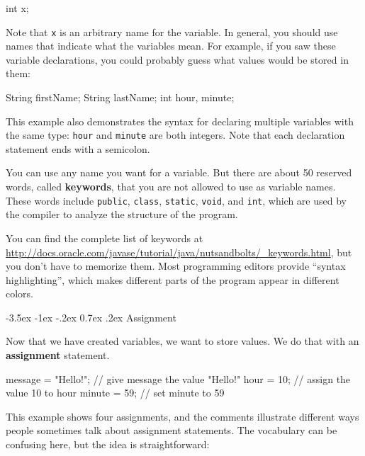 \documentclass[12pt]{book}
\makeatletter
\theoremstyle{exercise}
\newcommand{\java}[1]{\verb"#1"}
\renewcommand{\section}{\@startsection{section}{1}{\z@}%
    {-3.5ex \@plus -1ex \@minus -.2ex}%
    {0.7ex \@plus.2ex}%
    {\normalfont\Large\bfseries}}
\newcommand{\java}[1]{\lstinline{#1}} %
\makeatother
\begin{document}
\begin{code}
    int x;
\end{code}

Note that \java{x} is an arbitrary name for the variable.
In general, you should use names that indicate what the variables mean.
For example, if you saw these variable declarations, you could probably guess what values would be stored in them:

\begin{code}
    String firstName;
    String lastName;
    int hour, minute;
\end{code}

This example also demonstrates the syntax for declaring multiple variables with the same type: \java{hour} and \java{minute} are both integers.
Note that each declaration statement ends with a semicolon.

You can use any name you want for a variable.
But there are about 50 reserved words, called {\bf keywords}, that you are not allowed to use as variable names.
These words include \java{public}, \java{class}, \java{static}, \java{void}, and \java{int}, which are used by the compiler to analyze the structure of the program.

You can find the complete list of keywords at \url{http://docs.oracle.com/javase/tutorial/java/nutsandbolts/_keywords.html}, but you don't have to memorize them.
Most programming editors provide ``syntax highlighting'', which makes different parts of the program appear in different colors.


\section{Assignment}


Now that we have created variables, we want to store values.
We do that with an {\bf assignment} statement.

\begin{code}
    message = "Hello!";  // give message the value "Hello!"
    hour = 10;           // assign the value 10 to hour
    minute = 59;         // set minute to 59
\end{code}

This example shows four assignments, and the comments illustrate different ways people sometimes talk about assignment statements.
The vocabulary can be confusing here, but the idea is straightforward:
\end{document}
